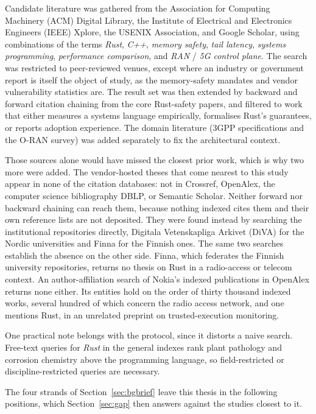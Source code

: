\documentclass[english,oneside,a4paper,censored,csm,software-track-2020]{HYthesisML}
\begin{document}
\begin{appendices}
Candidate literature was gathered from the Association for Computing Machinery (ACM) Digital
Library, the Institute of Electrical and Electronics Engineers (IEEE) Xplore, the USENIX
Association, and Google Scholar, using combinations of the terms \emph{Rust}, \emph{C++}, \emph{memory safety}, \emph{tail
latency}, \emph{systems programming}, \emph{performance comparison}, and \emph{RAN} / \emph{5G
control plane}. The search was restricted to peer-reviewed venues, except where an industry or
government report is itself the object of study, as the memory-safety mandates and vendor
vulnerability statistics are.
The result set was then extended by backward and forward citation chaining from the core
Rust-safety papers, and filtered to work that either measures a systems language empirically,
formalises Rust's guarantees, or reports adoption experience. The domain literature (3GPP specifications and
the O-RAN survey) was added separately to fix the architectural context.

Those sources alone would have missed the closest prior work, which is why two more were added.
The vendor-hosted theses that come nearest to this study appear in
none of the citation databases: not in Crossref, OpenAlex, the computer science bibliography
DBLP, or Semantic Scholar. Neither
forward nor backward chaining can reach them, because nothing indexed cites them and their own
reference lists are not deposited. They were found instead by searching the institutional
repositories directly, Digitala Vetenskapliga Arkivet (DiVA) for the Nordic universities and
Finna for the Finnish ones. The same
two searches establish the absence on the other side. Finna, which federates the Finnish
university repositories, returns no thesis on Rust in a radio-access or telecom context. An
author-affiliation search of Nokia's indexed publications in OpenAlex returns none either. Its
entities hold on the order of thirty thousand indexed works, several hundred of which concern the
radio access network, and one mentions Rust, in an unrelated preprint on trusted-execution
monitoring.

One practical note belongs with the protocol, since it distorts a naive search. Free-text queries
for \emph{Rust} in the general indexes rank plant pathology and corrosion chemistry above the
programming language, so field-restricted or discipline-restricted queries are necessary.

The four strands of Section~\ref{sec:bgbrief} leave this thesis in the following
positions, which Section~\ref{sec:gap} then answers against the studies closest to it.


\end{appendices}
\end{document}
